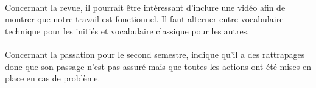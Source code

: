 \documentclass [a4paper] {article}
\begin{document}
\paragraph*{}
Concernant la revue, il pourrait être intéressant d'inclure une vidéo afin de montrer que notre travail est fonctionnel. Il faut alterner entre vocabulaire technique pour les initiés et vocabulaire classique pour les autres.

\paragraph*{}
Concernant la passation pour le second semestre, \Pierre{} indique qu'il a des rattrapages donc que son passage n'est pas assuré mais que toutes les actions ont été mises en place en cas de problème.
\end{document}
